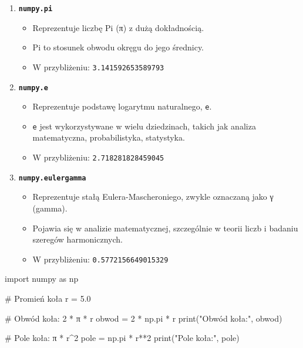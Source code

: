 \documentclass[
  polish,
  letterpaper,
  DIV=11,
  numbers=noendperiod]{scrreprt}
\newenvironment{Shaded}{\begin{snugshade}}{\end{snugshade}}
\newcommand{\BuiltInTok}[1]{\textcolor[rgb]{0.00,0.23,0.31}{#1}}
\newcommand{\CommentTok}[1]{\textcolor[rgb]{0.37,0.37,0.37}{#1}}
\newcommand{\DecValTok}[1]{\textcolor[rgb]{0.68,0.00,0.00}{#1}}
\newcommand{\FloatTok}[1]{\textcolor[rgb]{0.68,0.00,0.00}{#1}}
\newcommand{\ImportTok}[1]{\textcolor[rgb]{0.00,0.46,0.62}{#1}}
\newcommand{\NormalTok}[1]{\textcolor[rgb]{0.00,0.23,0.31}{#1}}
\newcommand{\OperatorTok}[1]{\textcolor[rgb]{0.37,0.37,0.37}{#1}}
\newcommand{\StringTok}[1]{\textcolor[rgb]{0.13,0.47,0.30}{#1}}
\providecommand{\tightlist}{%
  \setlength{\itemsep}{0pt}\setlength{\parskip}{0pt}}
\begin{document}
\begin{enumerate}
\def\labelenumi{\arabic{enumi}.}
\tightlist
\item
  \textbf{\texttt{numpy.pi}}

  \begin{itemize}
  \tightlist
  \item
    Reprezentuje liczbę Pi (π) z dużą dokładnością.\\
  \item
    Pi to stosunek obwodu okręgu do jego średnicy.\\
  \item
    W przybliżeniu: \texttt{3.141592653589793}
  \end{itemize}
\item
  \textbf{\texttt{numpy.e}}

  \begin{itemize}
  \tightlist
  \item
    Reprezentuje podstawę logarytmu naturalnego, \texttt{e}.\\
  \item
    \texttt{e} jest wykorzystywane w wielu dziedzinach, takich jak
    analiza matematyczna, probabilistyka, statystyka.\\
  \item
    W przybliżeniu: \texttt{2.718281828459045}
  \end{itemize}
\item
  \textbf{\texttt{numpy.eulergamma}}

  \begin{itemize}
  \tightlist
  \item
    Reprezentuje stałą Eulera-Mascheroniego, zwykle oznaczaną jako γ
    (gamma).
  \item
    Pojawia się w analizie matematycznej, szczególnie w teorii liczb i
    badaniu szeregów harmonicznych.
  \item
    W przybliżeniu: \texttt{0.5772156649015329}
  \end{itemize}
\end{enumerate}

\begin{Shaded}
\begin{Highlighting}[]
\ImportTok{import}\NormalTok{ numpy }\ImportTok{as}\NormalTok{ np}

\CommentTok{\# Promień koła}
\NormalTok{r }\OperatorTok{=} \FloatTok{5.0}

\CommentTok{\# Obwód koła: 2 * π * r}
\NormalTok{obwod }\OperatorTok{=} \DecValTok{2} \OperatorTok{*}\NormalTok{ np.pi }\OperatorTok{*}\NormalTok{ r}
\BuiltInTok{print}\NormalTok{(}\StringTok{"Obwód koła:"}\NormalTok{, obwod)}

\CommentTok{\# Pole koła: π * r\^{}2}
\NormalTok{pole }\OperatorTok{=}\NormalTok{ np.pi }\OperatorTok{*}\NormalTok{ r}\OperatorTok{**}\DecValTok{2}
\BuiltInTok{print}\NormalTok{(}\StringTok{"Pole koła:"}\NormalTok{, pole)}
\end{Highlighting}
\end{Shaded}
\end{document}
